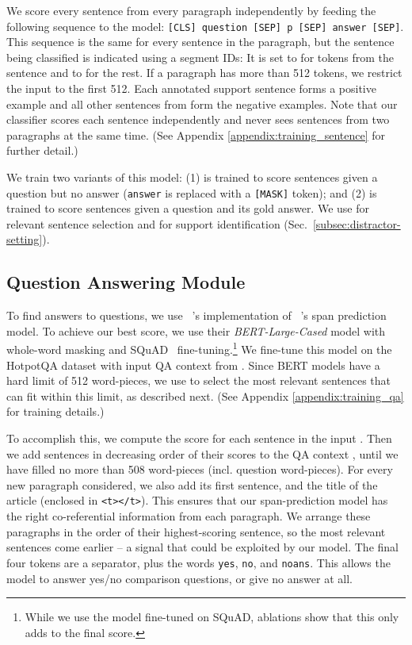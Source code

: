 \documentclass[11pt,a4paper]{article}
\newcommand{\hpqa}{HotpotQA\xspace}
\newcommand{\ourlm}{\emph{BERT-Large-Cased}\xspace}
\newcommand{\namecite}[1]{\citeauthor{#1}~\shortcite{#1}}
\begin{document}
We score every sentence  from every paragraph  independently by feeding the following sequence to the model: \texttt{[CLS] question [SEP] p [SEP] answer [SEP]}. This sequence is the same for every sentence in the paragraph, but the sentence being classified is indicated using a segment IDs: It is set to  for tokens from the sentence and to  for the rest. If a paragraph has more than 512 tokens, we restrict the input to the first 512. Each annotated support sentence forms a positive example and all other sentences from  form the negative examples. Note that our classifier scores each sentence independently and never sees sentences from two paragraphs at the same time. (See Appendix \ref{appendix:training_sentence} for further detail.)

We train two variants of this model: (1)  is trained to score sentences given a question but no answer (\texttt{answer} is replaced with a \texttt{[MASK]} token); and (2)  is trained to score sentences given a question and its gold answer. We use  for relevant sentence selection and  for support identification (Sec.~\ref{subsec:distractor-setting}).


\subsection{Question Answering Module}
\label{subsec:qa-module}

To find answers to questions, we use \namecite{huggingface}'s implementation of \namecite{devlin2018bert}'s span prediction model. To achieve our best score, we use their \ourlm model with whole-word masking and  SQuAD~\cite{squad} fine-tuning.\footnote{While we use the model fine-tuned on SQuAD, ablations show that this only adds  to the final score.}
We fine-tune this model on the \hpqa dataset with input QA context  from . Since BERT models have a hard limit of 512 word-pieces, we use  to select the most relevant sentences that can fit within this limit, as described next. (See Appendix \ref{appendix:training_qa} for training details.)

To accomplish this, we compute the score  for each sentence in the input . Then we add sentences in decreasing order of their scores to the QA context , until we have filled no more than 508 word-pieces (incl. question word-pieces). For every new paragraph considered, we also add its first sentence, and the title of the article (enclosed in \texttt{<t></t>}). This ensures that our span-prediction model has the right co-referential information from each paragraph. We arrange these paragraphs in the order of their highest-scoring sentence, so the most relevant sentences come earlier  -- a signal that could be exploited by our model. The final four tokens are a separator, plus the words \texttt{yes}, \texttt{no}, and \texttt{noans}. This allows the model to answer yes/no comparison questions, or give no answer at all.
\end{document}
